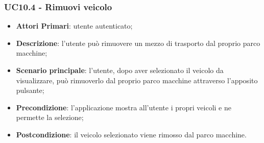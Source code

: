 \subsubsection{UC10.4 - Rimuovi veicolo}
\begin{itemize}
	\item \textbf{Attori Primari}: utente autenticato;
	\item \textbf{Descrizione}: l'utente può rimuovere un mezzo di trasporto dal proprio parco macchine;
	\item \textbf{Scenario principale}: l'utente, dopo aver selezionato il veicolo da visualizzare, può rimuoverlo dal proprio parco macchine attraverso l'apposito pulsante;
	\item \textbf{Precondizione}: l'applicazione mostra all'utente i propri veicoli e ne permette la selezione;
	\item \textbf{Postcondizione}: il veicolo selezionato viene rimosso dal parco macchine.
\end{itemize}